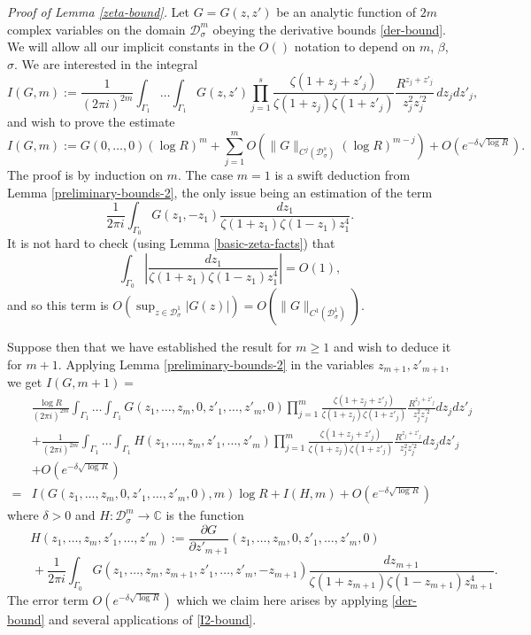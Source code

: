 \documentclass[12pt,a4paper,reqno]{amsart}
\numberwithin{equation}{section}
\theoremstyle{plain}
\theoremstyle{definition}
\renewcommand{\geq}{\geqslant}
\def\D{{\mathcal D}}
\def\C{{\mathbb C}}
\def\vs{\vspace{11pt}}
\def\ni{\noindent}
\begin{document}
\noindent\textit{Proof of Lemma \ref{zeta-bound}.}  Let $G = G(z,z')$ be
an analytic function of $2m$ complex variables on the domain $\D^m_\sigma$
obeying the derivative bounds \eqref{der-bound}.  We will allow all our implicit constants in the $O()$ notation to
depend on $m$, $\beta$, $\sigma$.
We are interested in the integral
\[ I(G,m) := \frac{1}{(2\pi i)^{2m}}\int_{\Gamma_1} \dots \int_{\Gamma_1} G(z,z')\prod_{j=1}^s \frac{\zeta(1+z_j + z'_j)}{\zeta(1 + z_j)\zeta(1 + z'_j)} \frac{R^{z_j + z'_j}}{z_j^2z^{\prime 2}_j} \, dz_jdz'_j, \]
and wish to prove the estimate
\[ I(G,m) := G(0,\dots,0) (\log R)^{m} + \sum_{j=1}^mO(\|G\|_{C^j(\mathcal{D}^s_\sigma)}(\log R)^{m-j}) + O(e^{-\delta\sqrt{\log R}}).\]
The proof is by induction on $m$.
The case $m = 1$ is a swift deduction from Lemma \ref{preliminary-bounds-2}, the only issue being an estimation of the term 
\[ \frac{1}{2\pi i} \int_{\Gamma_0} G(z_1,-z_1) \frac{dz_1}{\zeta(1 + z_1)\zeta(1 - z_1)z_1^4}.\]
It is not hard to check (using Lemma \ref{basic-zeta-facts}) that 
\begin{equation}\label{zb1} \int_{\Gamma_0} \left| \frac{dz_1}{\zeta(1 + z_1)\zeta(1 - z_1) z_1^4} \right| = O(1),\end{equation}
and so this term is $O(\sup_{z \in \mathcal{D}^1_\sigma} |G(z)|) = O(\|G\|_{C^1(\mathcal{D}_{\sigma}^1)})$.\vs

\ni Suppose then that we have established the result for $m \geq 1$ and wish to deduce it for $m+1$. 
Applying Lemma \ref{preliminary-bounds-2} in the variables $z_{m+1},z'_{m+1}$, we get $I(G,m+1) = $
\begin{align*}
 & \frac{\log R}{(2\pi i)^{2m}}\int_{\Gamma_1}\dots\int_{\Gamma_1} G(z_1,\dots,z_m,0,z'_1,\dots,z'_m,0) \prod_{j=1}^m \frac{\zeta(1 + z_j + z'_j)}{\zeta(1 + z_j)\zeta(1 + z'_j)}\frac{R^{z_j + z'_j}}{z_j^2z^{\prime 2}_j} dz_jdz'_j \\
& + \frac{1}{(2\pi i)^{2m}}\int_{\Gamma_1}\dots\int_{\Gamma_1} H(z_1,\dots,z_m,z'_1,\dots,z'_m)\prod_{j=1}^m\frac{\zeta(1 + z_j + z'_j)}{\zeta(1 + z_j)\zeta(1 + z'_j)}\frac{R^{z_j + z'_j}}{z_j^2z^{\prime 2}_j}dz_jdz'_j \\
& + O(e^{-\delta\sqrt{\log R}}) \\
=&  I(G(z_1,\dots,z_m,0,z'_1,\dots,z'_m,0),m) \log R
+ I(H,m) + O(e^{-\delta \sqrt{\log R}})
\end{align*}
where $\delta > 0$ and $H: \D^m_\sigma \to \C$ is the function
\[ H(z_1,\dots,z_m,z'_1,\dots,z'_m) := \frac{\partial G}{\partial z'_{m+1}}(z_1,\dots,z_m,0,z'_1,\dots,z'_m,0) \qquad\qquad\] \[ \qquad + \frac{1}{2\pi i} \int_{\Gamma_0} G(z_1,\dots,z_m,z_{m+1},z'_1,\dots,z'_m,-z_{m+1}) \frac{dz_{m+1}}{\zeta(1 + z_{m+1})\zeta(1 - z_{m+1})z_{m+1}^4}.\]
The error term $O(e^{-\delta\sqrt{\log R}})$ which we claim here arises by applying \eqref{der-bound} and several
applications of \eqref{I2-bound}.\vs
\end{document}
